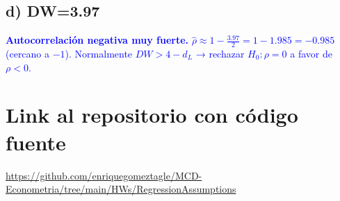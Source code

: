 \documentclass[10pt]{article}
\begin{document}
\subsection{d) DW=3.97}
\textcolor{blue}{
\textbf{Autocorrelación negativa muy fuerte.} $\hat\rho\approx1-\tfrac{3.97}{2}=1-1.985=-0.985$ (cercano a $-1$). Normalmente $DW>4-d_L$ → rechazar $H_0:\rho=0$ a favor de $\rho<0$.
}
\section{Link al repositorio con código fuente}
\url{https://github.com/enriquegomeztagle/MCD-Econometria/tree/main/HWs/RegressionAssumptions}
\end{document}
